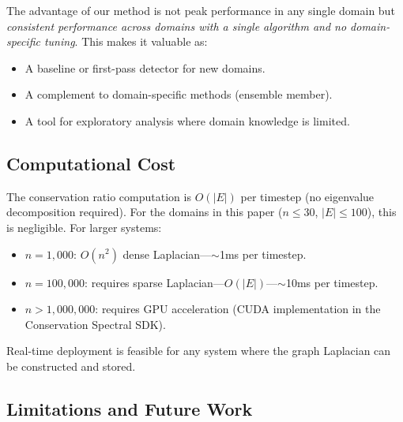\documentclass[11pt,a4paper]{article}
\begin{document}
The advantage of our method is not peak performance in any single domain but
\emph{consistent performance across domains with a single algorithm and no
domain-specific tuning}.  This makes it valuable as:
\begin{itemize}
  \item A baseline or first-pass detector for new domains.
  \item A complement to domain-specific methods (ensemble member).
  \item A tool for exploratory analysis where domain knowledge is limited.
\end{itemize}

\subsection{Computational Cost}

The conservation ratio computation is $O(|E|)$ per timestep (no eigenvalue
decomposition required).  For the domains in this paper ($n \leq 30$, $|E|
\leq 100$), this is negligible.  For larger systems:
\begin{itemize}
  \item $n = 1{,}000$: $O(n^2)$ dense Laplacian---$\sim$1ms per timestep.
  \item $n = 100{,}000$: requires sparse Laplacian---$O(|E|)$---$\sim$10ms
        per timestep.
  \item $n > 1{,}000{,}000$: requires GPU acceleration (CUDA implementation
        in the Conservation Spectral SDK).
\end{itemize}

Real-time deployment is feasible for any system where the graph Laplacian can
be constructed and stored.

\subsection{Limitations and Future Work}
\end{document}
